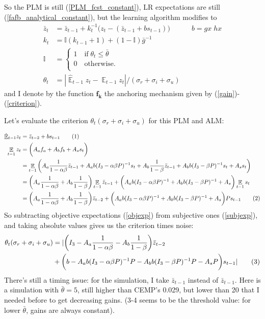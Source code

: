 \documentclass[11pt]{article}
\renewcommand{\[}{\begin{equation}}
\renewcommand{\]}{\end{equation}}
\DeclareMathOperator{\E}{\mathbb{E}}
\newcommand\numberthis{\addtocounter{equation}{1}\tag{\theequation}} %
\begin{document}
So the PLM is still (\ref{PLM_fcst_constant}), LR expectations are still (\ref{fafb_analytical_constant}), but the learning algorithm modifies to
 \begin{align}
\bar{z}_{t} & = \bar{z}_{t-1} +k_t^{-1}\big(z_{t} -(\bar{z}_{t-1}+bs_{t-1}) \big) \quad  \quad \quad b= gx\;hx \label{RLS_anchoring} \\
k_t &= \mathbb{I}(k_{t-1} +1) + (1-\mathbb{I})\bar{g}^{-1} \label{gain} \\
\mathbb{I} & = \begin{cases} 1 \quad \text{if} \; \theta_t \leq \bar{\theta}  \\ 0 \quad \text{otherwise.}\\
\end{cases} \\
\theta_t & = |\hat{\E}_{t-1}z_t - \E_{t-1}z_t| / (\sigma_r + \sigma_i + \sigma_u) \label{criterion}
\end{align}
and I denote by the function $\mathbf{f_k}$ the anchoring mechanism given by (\ref{gain})-(\ref{criterion}).

Let's evaluate the criterion $\theta_t (\sigma_r + \sigma_i + \sigma_u)$ for this PLM and ALM:
 
 \begin{align*}
 \hat{\E}_{t-1}z_t & =\bar{z}_{t-2} + b s_{t-1} \numberthis \label{subjexp} \\
  \E_{t-1}z_t & = \bigg( A_a f_a + A_b f_b + A_s s_t\bigg) \\
  & = \E_{t-1}\bigg( A_a \frac{1}{1-\alpha\beta}\bar{z}_{t-1}  + A_a b(I_3 - \alpha\beta P)^{-1}s_t 
   +A_b \frac{1}{1-\beta}\bar{z}_{t-1}  + A_b b(I_3 - \beta P)^{-1}s_t  + A_s s_t\bigg) \\
   & = \bigg(A_a  \frac{1}{1-\alpha\beta}+ A_b \frac{1}{1-\beta}  \bigg) \E_{t-1}\bar{z}_{t-1}  
   + \bigg( A_a b(I_3 - \alpha\beta P)^{-1}+ A_bb(I_3 - \beta P)^{-1}  +A_s\bigg) \E_{t-1}s_t \\
   & = \bigg(A_a  \frac{1}{1-\alpha\beta}+ A_b \frac{1}{1-\beta}  \bigg)\bar{z}_{t-2}  
   + \bigg( A_a b(I_3 - \alpha\beta P)^{-1}+ A_bb(I_3 - \beta P)^{-1}  +A_s\bigg) Ps_{t-1} \numberthis \label{objexp}
 \end{align*}
So subtracting objective expectations (\ref{objexp}) from subjective ones (\ref{subjexp}), and taking absolute values gives us the criterion times noise:
\begin{align*}
\theta_t (\sigma_r + \sigma_i + \sigma_u) & = |\bigg(I_3 - A_a  \frac{1}{1-\alpha\beta}- A_b \frac{1}{1-\beta}  \bigg)\bar{z}_{t-2}  \\
  & + \bigg(b - A_a b(I_3 - \alpha\beta P)^{-1}P- A_bb(I_3 - \beta P)^{-1}P  -A_sP\bigg) s_{t-1} |\numberthis
\end{align*}
There's still a timing issue: for the simulation, I take $\bar{z}_{t-1}$ instead of $\bar{z}_{t-1}$.
Here is a simulation with $\bar{\theta} = 5$, still higher than CEMP's 0.029, but lower than 20 that I needed before to get decreasing gains. (3-4 seems to be the threshold value: for lower $\bar{\theta}$, gains are always constant). 
\end{document}
